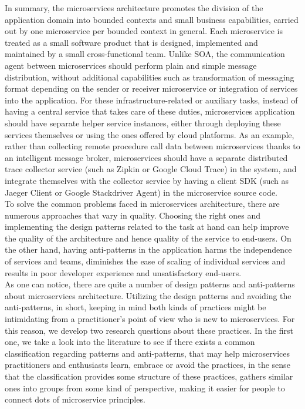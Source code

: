 \documentclass{Configuration_Files/PoliMi3i_thesis}
\begin{document}
In summary, the microservices architecture promotes the division of the application domain into bounded contexts and small business capabilities, carried out by one microservice per bounded context in general.
Each microservice is treated as a small software product that is designed, implemented and maintained by a small cross-functional team. Unlike SOA, the communication agent between microservices should perform plain and simple message distribution, without additional capabilities such as transformation of messaging format depending on the sender or receiver microservice or integration of services into the application.
For these infrastructure-related or auxiliary tasks, instead of having a central service that takes care of these duties, microservices application should have separate helper service instances, either through deploying these services themselves or using the ones offered by cloud platforms.
As an example, rather than collecting remote procedure call data between microservices thanks to an intelligent message broker, microservices should have a separate distributed trace collector service (such as Zipkin or Google Cloud Trace) in the system, and integrate themselves with the collector service by having a client SDK (such as Jaeger Client or Google Stackdriver Agent) in the microservice source code.
\\
To solve the common problems faced in microservices architecture, there are numerous approaches that vary in quality.
Choosing the right ones and implementing the design patterns related to the task at hand can help improve the quality of the architecture and hence quality of the service to end-users.
On the other hand, having anti-patterns in the application harms the independence of services and teams, diminishes the ease of scaling of individual services and results in poor developer experience and unsatisfactory end-users.
\\
As one can notice, there are quite a number of design patterns and anti-patterns about microservices architecture.
Utilizing the design patterns and avoiding the anti-patterns, in short, keeping in mind both kinds of practices might be intimidating from a practitioner's point of view who is new to microservices.
For this reason, we develop two research questions about these practices.
In the first one, we take a look into the literature to see if there exists a common classification regarding patterns and anti-patterns, that may help microservices practitioners and enthusiasts learn, embrace or avoid the practices, in the sense that the classification provides some structure of these practices, gathers similar ones into groups from some kind of perspective, making it easier for people to connect dots of microservice principles.
\end{document}
